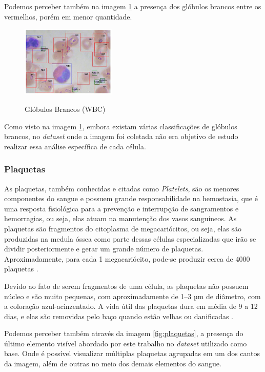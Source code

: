 Podemos perceber também na imagem \ref{fig:wbc} a presença dos glóbulos brancos entre os vermelhos, porém em menor quantidade.

\begin{figure}[!htb]
	\centering
	\caption{Glóbulos Brancos (WBC)}
	\includegraphics[width=0.40\textwidth]{img/wbc.jpg}
	\label{fig:wbc}
\end{figure}

Como visto na imagem \ref{fig:wbc}, embora existam várias classificações de glóbulos brancos, no \emph{dataset} onde a imagem foi coletada não era objetivo de estudo realizar essa análise específica de cada célula.

\subsubsection{Plaquetas}
As plaquetas, também conhecidas e citadas como \emph{Platelets}, são os menores componentes do sangue e possuem grande responsabilidade na hemostasia, que é uma resposta fisiológica para a prevenção e interrupção de sangramentos e hemorragias, ou seja, elas atuam na manutenção dos vasos sanguíneos. As plaquetas são fragmentos do citoplasma de megacariócitos, ou seja, elas são produzidas na medula óssea como parte dessas células especializadas que irão se dividir posteriormente e gerar um grande número de plaquetas. Aproximadamente, para cada 1 megacariócito, pode-se produzir cerca de 4000 plaquetas \cite{abcOfCbc}.

Devido ao fato de serem fragmentos de uma célula, as plaquetas não possuem núcleo e são muito pequenas, com aproximadamente de 1–3 µm de diâmetro, com a coloração azul-acinzentado. A vida útil das plaquetas dura em média de 9 a 12 dias, e elas são removidas pelo baço quando estão velhas ou danificadas \cite{abcOfCbc}.

Podemos perceber também através da imagem \ref{fig:plaquetas}, a presença do último elemento visível abordado por este trabalho no \emph{dataset} utilizado como base. Onde é possível visualizar múltiplas plaquetas agrupadas em um dos cantos da imagem, além de outras no meio dos demais elementos do sangue.

